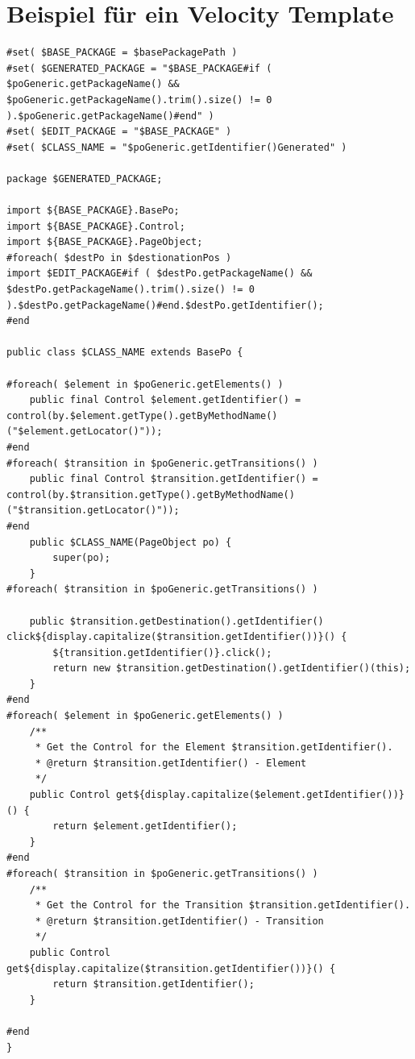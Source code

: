 \section{Beispiel für ein Velocity Template}
\label{anhang:beispiel_velocity_template}
\begin{lstlisting}[caption={poGenerated.vm},label={lst:template_pogenerated}]
#set( $BASE_PACKAGE = $basePackagePath )
#set( $GENERATED_PACKAGE = "$BASE_PACKAGE#if ( $poGeneric.getPackageName() && $poGeneric.getPackageName().trim().size() != 0 ).$poGeneric.getPackageName()#end" )
#set( $EDIT_PACKAGE = "$BASE_PACKAGE" )
#set( $CLASS_NAME = "$poGeneric.getIdentifier()Generated" )

package $GENERATED_PACKAGE;

import ${BASE_PACKAGE}.BasePo;
import ${BASE_PACKAGE}.Control;
import ${BASE_PACKAGE}.PageObject;
#foreach( $destPo in $destionationPos )
import $EDIT_PACKAGE#if ( $destPo.getPackageName() && $destPo.getPackageName().trim().size() != 0 ).$destPo.getPackageName()#end.$destPo.getIdentifier();
#end

public class $CLASS_NAME extends BasePo {

#foreach( $element in $poGeneric.getElements() )
	public final Control $element.getIdentifier() = control(by.$element.getType().getByMethodName()("$element.getLocator()"));
#end
#foreach( $transition in $poGeneric.getTransitions() )
	public final Control $transition.getIdentifier() = control(by.$transition.getType().getByMethodName()("$transition.getLocator()"));
#end
	public $CLASS_NAME(PageObject po) {
		super(po);
	}
#foreach( $transition in $poGeneric.getTransitions() )
	
	public $transition.getDestination().getIdentifier() click${display.capitalize($transition.getIdentifier())}() {
		${transition.getIdentifier()}.click();
		return new $transition.getDestination().getIdentifier()(this);
	}
#end  
#foreach( $element in $poGeneric.getElements() )
	/**
	 * Get the Control for the Element $transition.getIdentifier().
	 * @return $transition.getIdentifier() - Element
	 */
	public Control get${display.capitalize($element.getIdentifier())}() {
		return $element.getIdentifier();
	}	
#end
#foreach( $transition in $poGeneric.getTransitions() )
	/**
	 * Get the Control for the Transition $transition.getIdentifier().
	 * @return $transition.getIdentifier() - Transition
	 */
	public Control get${display.capitalize($transition.getIdentifier())}() {
		return $transition.getIdentifier();
	}
	
#end
}

\end{lstlisting} 
